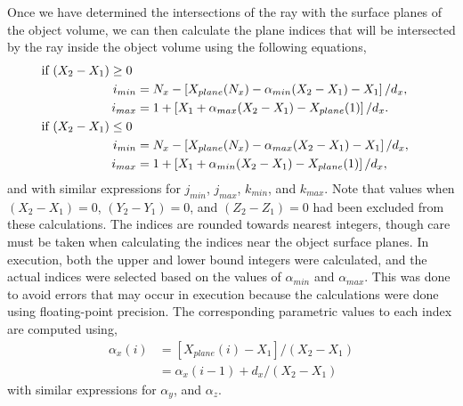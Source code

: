 Once we have determined the intersections of the ray with the surface planes of the object volume, we can then calculate the plane indices that will be intersected by the ray inside the object volume using the following equations, 
%
\begin{equation}
	\begin{aligned}
	\text{if $ (X_2 - X_1) \geq 0 $ }\\
	i_{min} &= N_x - \left[ X_{plane}(N_x) - \alpha_{min} (X_2 - X_1) - X_1 \right] /  d_x, \\
	i_{max} &= 1 + \left[ X_1 + \alpha_{max} (X_2 - X_1) - X_{plane}(1) \right] / d_x. \\
	\text{if $ (X_2 - X_1) \leq 0 $ }\\
	i_{min} &= N_x - \left[ X_{plane}(N_x) - \alpha_{max} (X_2 - X_1) - X_1 \right] /  d_x, \\
	i_{max} &= 1 + \left[ X_1 + \alpha_{min} (X_2 - X_1) - X_{plane}(1) \right] / d_x, 
	\end{aligned}
\label{eq:siddon_ijkminmax}
\end{equation}
%
and with similar expressions for $j_{min}$, $j_{max}$, $k_{min}$, and $k_{max}$.  Note that values when $(X_2 - X_1) = 0$, $(Y_2 - Y_1) = 0$, and $(Z_2 - Z_1) = 0$ had been excluded from these calculations.  The indices are rounded towards nearest integers, though care must be taken when calculating the indices near the object surface planes.  In execution, both the upper and lower bound integers were calculated, and the actual indices were selected based on the values of $\alpha_{min}$ and $\alpha_{max}$.  This was done to avoid errors that may occur in execution because the calculations were done using floating-point precision.  The corresponding parametric values to each index are computed using,
%
\begin{equation}
\begin{aligned}
\alpha_x(i) &= [ X_{plane}(i) - X_1 ] / (X_2 - X_1) \\
			&=\alpha_x(i-1) + d_x / (X_2 - X_1) \,
\end{aligned}
\label{ea:siddon_alphas}
\end{equation}
%
with similar expressions for $\alpha_y$, and $\alpha_z$.  


